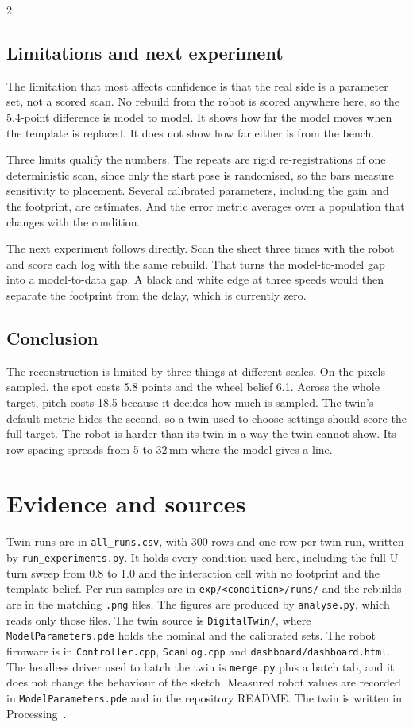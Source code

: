 \documentclass[a4paper,10pt]{article}
\begin{document}
\begin{multicols*}{2}
\subsection*{Limitations and next experiment}
The limitation that most affects confidence is that the real side is a parameter
set, not a scored scan. No rebuild from the robot is scored anywhere here, so the
5.4-point difference is model to model. It shows how far the model moves when the
template is replaced. It does not show how far either is from the bench.

Three limits qualify the numbers. The repeats are rigid re-registrations of one
deterministic scan, since only the start pose is randomised, so the bars measure
sensitivity to placement. Several calibrated parameters, including the gain and
the footprint, are estimates. And the error metric averages over a population that
changes with the condition.

The next experiment follows directly. Scan the sheet three times with the robot and
score each log with the same rebuild. That turns the model-to-model gap into a
model-to-data gap. A black and white edge at three speeds would then separate the
footprint from the delay, which is currently zero.

\subsection*{Conclusion}
The reconstruction is limited by three things at different scales. On the pixels
sampled, the spot costs 5.8 points and the wheel belief 6.1. Across the whole
target, pitch costs 18.5 because it decides how much is sampled. The twin's default
metric hides the second, so a twin used to choose settings should score the full
target. The robot is harder than its twin in a way the twin cannot show. Its row
spacing spreads from 5 to 32\,mm where the model gives a line.

\newpage
\section*{Evidence and sources}
Twin runs are in \texttt{all\_runs.csv}, with 300 rows and one row per twin run,
written by \texttt{run\_experiments.py}. It holds every condition used here,
including the full U-turn sweep from 0.8 to 1.0 and the interaction cell with no
footprint and the template belief. Per-run samples are in
\texttt{exp/<condition>/runs/} and the rebuilds are in the matching
\texttt{.png} files. The figures are produced by \texttt{analyse.py}, which reads
only those files. The twin source is \texttt{DigitalTwin/}, where
\texttt{ModelParameters.pde} holds the nominal and the calibrated sets. The robot
firmware is in \texttt{Controller.cpp}, \texttt{ScanLog.cpp} and
\texttt{dashboard/dashboard.html}. The headless driver used to batch the twin is
\texttt{merge.py} plus a batch tab, and it does not change the behaviour of the
sketch. Measured robot values are recorded in \texttt{ModelParameters.pde} and in
the repository README. The twin is written in Processing~\cite{processing}.


\end{multicols*}
\end{document}
